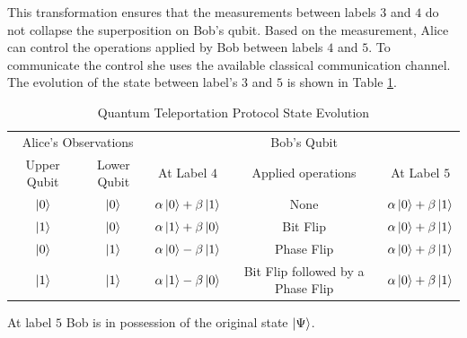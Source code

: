 This transformation ensures that the measurements between labels $3$ and $4$ do not collapse the superposition on Bob's qubit.
% 
Based on the measurement, Alice can control the operations applied by Bob between labels $4$ and $5$.
To communicate the control she uses the available classical communication channel.
The evolution of the state between label's $3$ and $5$ is shown in Table \ref{tab:qtelepregress}.

\begin{table}

\begin{center}
\begin{tabular}{|cc|ccc|}
\multicolumn{2}{|c|}{Alice's Observations}  & \multicolumn{3}{c|}{Bob's Qubit} \\
Upper Qubit & Lower Qubit & At Label $4$ & Applied operations & At Label $5$\\
$\left\vert{0}\right\rangle$ & $\left\vert{0}\right\rangle$ & $\alpha\left\vert{0}\right\rangle+\beta\left\vert{1}\right\rangle$ & None& $\alpha\left\vert{0}\right\rangle+\beta\left\vert{1}\right\rangle$\\
$\left\vert{1}\right\rangle$ & $\left\vert{0}\right\rangle$ & $\alpha\left\vert{1}\right\rangle+\beta\left\vert{0}\right\rangle$ & Bit Flip& $\alpha\left\vert{0}\right\rangle+\beta\left\vert{1}\right\rangle$\\
$\left\vert{0}\right\rangle$ & $\left\vert{1}\right\rangle$ & $\alpha\left\vert{0}\right\rangle-\beta\left\vert{1}\right\rangle$ & Phase Flip& $\alpha\left\vert{0}\right\rangle+\beta\left\vert{1}\right\rangle$\\
$\left\vert{1}\right\rangle$ & $\left\vert{1}\right\rangle$ & $\alpha\left\vert{1}\right\rangle-\beta\left\vert{0}\right\rangle$ & Bit Flip followed by a Phase Flip& $\alpha\left\vert{0}\right\rangle+\beta\left\vert{1}\right\rangle$
\end{tabular}
\end{center}
\caption{Quantum Teleportation Protocol State Evolution}
\label{tab:qtelepregress}
\end{table}

At label $5$ Bob is in possession of the original state $\left\vert{\Psi}\right\rangle$.

